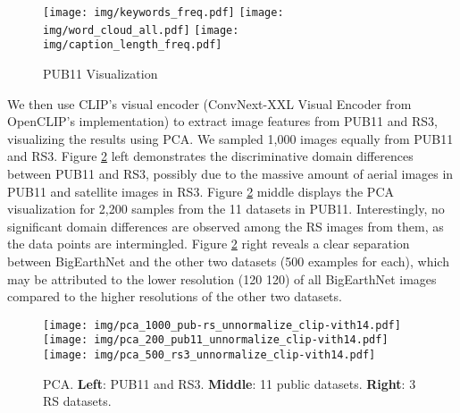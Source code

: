 \documentclass[journal]{IEEEtran}
\begin{document}
\begin{figure}[htbp]
    \centering
    \texttt{[image: img/keywords\_freq.pdf]}
    \texttt{[image: img/word\_cloud\_all.pdf]}
    \texttt{[image: img/caption\_length\_freq.pdf]}
    \caption{PUB11 Visualization}
    \label{fig:dataset_description}
\end{figure}

 We then use CLIP's visual encoder (ConvNext-XXL Visual Encoder from OpenCLIP's implementation) to extract image features from PUB11 and RS3, visualizing the results using PCA. We sampled 1,000 images equally from PUB11 and RS3. Figure \ref{fig:pca} left demonstrates the discriminative domain differences between PUB11 and RS3, possibly due to the massive amount of aerial images in PUB11 and satellite images in RS3. Figure \ref{fig:pca} middle displays the PCA visualization for 2,200 samples from the 11 datasets in PUB11. Interestingly, no significant domain differences are observed among the RS images from them, as the data points are intermingled. Figure \ref{fig:pca} right reveals a clear separation between BigEarthNet and the other two datasets (500 examples for each), which may be attributed to the lower resolution (120  120) of all BigEarthNet images compared to the higher resolutions of the other two datasets.
 
\begin{figure}[htbp]
    \centering
    \texttt{[image: img/pca\_1000\_pub-rs\_unnormalize\_clip-vith14.pdf]}
    \texttt{[image: img/pca\_200\_pub11\_unnormalize\_clip-vith14.pdf]}
    \texttt{[image: img/pca\_500\_rs3\_unnormalize\_clip-vith14.pdf]}
    \caption{PCA. \textbf{Left}: PUB11 and RS3. \textbf{Middle}: 11 public datasets. \textbf{Right}: 3 RS datasets.}
    \label{fig:pca}
\end{figure}
\end{document}
